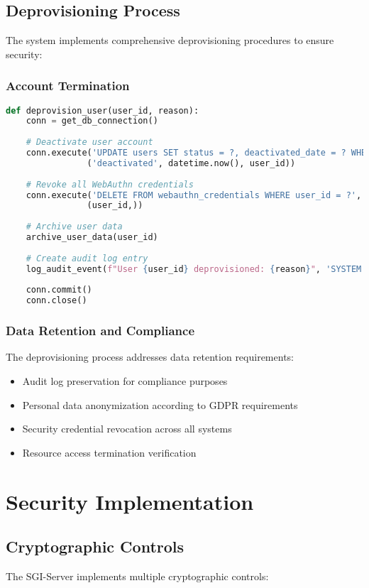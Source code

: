 \documentclass[12pt,a4paper]{article}
\begin{document}
\subsection{Deprovisioning Process}
The system implements comprehensive deprovisioning procedures to ensure security:

\subsubsection{Account Termination}
\begin{lstlisting}[language=Python, caption=User Deprovisioning Implementation]
def deprovision_user(user_id, reason):
    conn = get_db_connection()
    
    # Deactivate user account
    conn.execute('UPDATE users SET status = ?, deactivated_date = ? WHERE id = ?', 
                ('deactivated', datetime.now(), user_id))
    
    # Revoke all WebAuthn credentials
    conn.execute('DELETE FROM webauthn_credentials WHERE user_id = ?', 
                (user_id,))
    
    # Archive user data
    archive_user_data(user_id)
    
    # Create audit log entry
    log_audit_event(f"User {user_id} deprovisioned: {reason}", 'SYSTEM')
    
    conn.commit()
    conn.close()
\end{lstlisting}

\subsubsection{Data Retention and Compliance}
The deprovisioning process addresses data retention requirements:
\begin{itemize}
    \item Audit log preservation for compliance purposes
    \item Personal data anonymization according to GDPR requirements
    \item Security credential revocation across all systems
    \item Resource access termination verification
\end{itemize}

\section{Security Implementation}

\subsection{Cryptographic Controls}
The SGI-Server implements multiple cryptographic controls:
\end{document}
